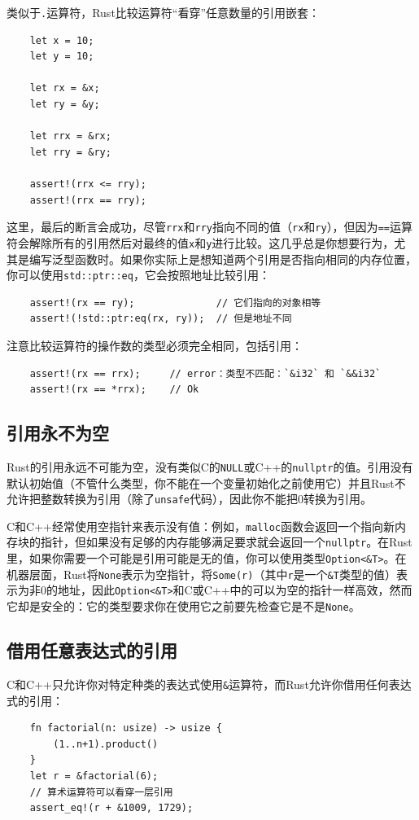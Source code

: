 类似于\texttt{.}运算符，Rust比较运算符“看穿”任意数量的引用嵌套：
\begin{verbatim}
    let x = 10;
    let y = 10;

    let rx = &x;
    let ry = &y;

    let rrx = &rx;
    let rry = &ry;

    assert!(rrx <= rry);
    assert!(rrx == rry);
\end{verbatim}

这里，最后的断言会成功，尽管\texttt{rrx}和\texttt{rry}指向不同的值（\texttt{rx}和\texttt{ry}），但因为\texttt{==}运算符会解除所有的引用然后对最终的值\texttt{x}和\texttt{y}进行比较。这几乎总是你想要行为，尤其是编写泛型函数时。如果你实际上是想知道两个引用是否指向相同的内存位置，你可以使用\texttt{std::ptr::eq}，它会按照地址比较引用：
\begin{verbatim}
    assert!(rx == ry);              // 它们指向的对象相等
    assert!(!std::ptr:eq(rx, ry));  // 但是地址不同
\end{verbatim}

注意比较运算符的操作数的类型必须完全相同，包括引用：
\begin{verbatim}
    assert!(rx == rrx);     // error：类型不匹配：`&i32` 和 `&&i32`
    assert!(rx == *rrx);    // Ok
\end{verbatim}

\subsection{引用永不为空}
Rust的引用永远不可能为空，没有类似C的\texttt{NULL}或C++的\texttt{nullptr}的值。引用没有默认初始值（不管什么类型，你不能在一个变量初始化之前使用它）并且Rust不允许把整数转换为引用（除了\texttt{unsafe}代码），因此你不能把0转换为引用。

C和C++经常使用空指针来表示没有值：例如，\texttt{malloc}函数会返回一个指向新内存块的指针，但如果没有足够的内存能够满足要求就会返回一个\texttt{nullptr}。在Rust里，如果你需要一个可能是引用可能是无的值，你可以使用类型\texttt{Option<\&T>}。在机器层面，Rust将\texttt{None}表示为空指针，将\texttt{Some(r)}（其中\texttt{r}是一个\texttt{\&T}类型的值）表示为非0的地址，因此\texttt{Option<\&T>}和C或C++中的可以为空的指针一样高效，然而它却是安全的：它的类型要求你在使用它之前要先检查它是不是\texttt{None}。

\subsection{借用任意表达式的引用}
C和C++只允许你对特定种类的表达式使用\texttt{\&}运算符，而Rust允许你借用任何表达式的引用：
\begin{verbatim}
    fn factorial(n: usize) -> usize {
        (1..n+1).product()
    }
    let r = &factorial(6);
    // 算术运算符可以看穿一层引用
    assert_eq!(r + &1009, 1729);
\end{verbatim}

